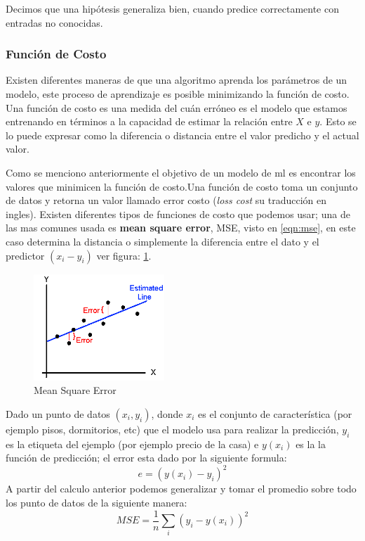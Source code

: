 Decimos que una hipótesis generaliza bien, cuando predice correctamente con entradas no conocidas.

\subsubsection{Función de Costo}
Existen diferentes maneras de que una algoritmo aprenda los parámetros de un modelo, este proceso de aprendizaje es posible minimizando la función de costo. Una función de costo es una medida del cuán erróneo es el modelo que estamos entrenando en términos a la capacidad de estimar la relación entre $X $ e $y $. Esto se lo puede expresar como la diferencia o distancia entre el valor predicho y el actual valor.

Como se menciono anteriormente el objetivo de un modelo de \ac{ml} es encontrar los valores que minimicen la función de costo.Una función de costo toma un conjunto de datos y retorna un valor llamado error costo (\textit{loss cost} su traducción en ingles). Existen diferentes tipos de funciones de costo que podemos usar; una de las mas comunes usada es \textbf{mean square error}, MSE, visto en \ref{eqn:mse}, en este caso determina la distancia o simplemente la diferencia entre el dato y el predictor $(x_i - y_i) $ ver figura: \ref{Fig:mse}.
\begin{figure}[H] \centering
  \includegraphics[height=4cm,keepaspectratio=true,clip=true]{imagenes/MarcoTeorico/mse-cost.png}
  \caption{Mean Square Error }\label{Fig:mse}
\end{figure}

Dado un punto de datos $(x_i,y_i) $, donde $x_i $ es el conjunto de característica (por ejemplo pisos, dormitorios, etc) que el modelo usa para realizar la predicción, $y_i $ es la etiqueta del ejemplo (por ejemplo precio de la casa) e $y(x_i)$ es la la función de predicción; el error esta dado por la siguiente formula:
\begin{equation}\label{eqn:error-mse}
e = (y(x_i) - y_i)^2
\end{equation} 
A partir del calculo anterior podemos generalizar y tomar el promedio sobre todo los punto de datos de la siguiente manera:
\begin{equation}
MSE =  \frac{1}{n}\sum_{i}(y_i - y(x_i))^2
\end{equation}

